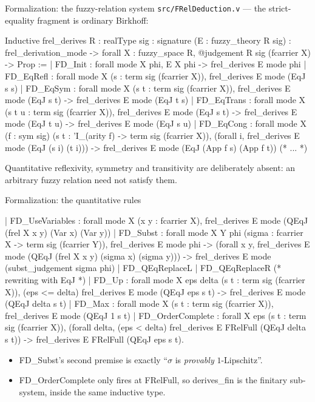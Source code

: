 \documentclass[10pt,aspectratio=169]{beamer}
\newcommand{\file}[1]{{\color{rocqcon}\texttt{#1}}}
\newcommand{\rid}[1]{{\ttfamily\small #1}}
\begin{document}
\begin{frame}[fragile]{Formalization: the fuzzy-relation system}
  \file{src/FRelDeduction.v} --- the strict-equality fragment is
  ordinary Birkhoff:
  \begin{srcbox}
Inductive frel_derives {R : realType} {sig : signature}
    (E : fuzzy_theory R sig) : frel_derivation_mode ->
    forall X : fuzzy_space R, @judgement R sig (fcarrier X) -> Prop :=
  | FD_Init : forall mode X phi,
      E X phi -> frel_derives E mode phi
  | FD_EqRefl : forall mode X (s : term sig (fcarrier X)),
      frel_derives E mode (EqJ s s)
  | FD_EqSym : forall mode X (s t : term sig (fcarrier X)),
      frel_derives E mode (EqJ s t) -> frel_derives E mode (EqJ t s)
  | FD_EqTrans : forall mode X (s t u : term sig (fcarrier X)),
      frel_derives E mode (EqJ s t) -> frel_derives E mode (EqJ t u) ->
      frel_derives E mode (EqJ s u)
  | FD_EqCong : forall mode X (f : sym sig)
      (s t : 'I_(arity f) -> term sig (fcarrier X)),
      (forall i, frel_derives E mode (EqJ (s i) (t i))) ->
      frel_derives E mode (EqJ (App f s) (App f t))
  (* ... *)
  \end{srcbox}
  Quantitative reflexivity, symmetry and transitivity are
  \alert{deliberately absent}: an arbitrary fuzzy relation need not
  satisfy them.
\end{frame}

\begin{frame}[fragile]{Formalization: the quantitative rules}
  \begin{srcbox}
  | FD_UseVariables : forall mode X (x y : fcarrier X),
      frel_derives E mode (QEqJ (frel X x y) (Var x) (Var y))
  | FD_Subst : forall mode X Y phi
      (sigma : fcarrier X -> term sig (fcarrier Y)),
      frel_derives E mode phi ->
      (forall x y, frel_derives E mode
          (QEqJ (frel X x y) (sigma x) (sigma y))) ->
      frel_derives E mode (subst_judgement sigma phi)
  | FD_QEqReplaceL | FD_QEqReplaceR (* rewriting with EqJ *)
  | FD_Up : forall mode X eps delta (s t : term sig (fcarrier X)),
      (eps <= delta)%
      frel_derives E mode (QEqJ eps s t) -> frel_derives E mode (QEqJ delta s t)
  | FD_Max : forall mode X (s t : term sig (fcarrier X)),
      frel_derives E mode (QEqJ 1 s t)
  | FD_OrderComplete : forall X eps (s t : term sig (fcarrier X)),
      (forall delta, (eps < delta)%
        frel_derives E FRelFull (QEqJ delta s t)) ->
      frel_derives E FRelFull (QEqJ eps s t).
  \end{srcbox}
  \begin{itemize}\small
    \item \rid{FD\_Subst}'s second premise is exactly ``$\sigma$ is
      \emph{provably} $1$-Lipschitz''.
    \item \rid{FD\_OrderComplete} only fires at \rid{FRelFull}, so
      \rid{derives\_fin} is the finitary sub-system, inside the
      same inductive type.
  \end{itemize}
\end{frame}
\end{document}
